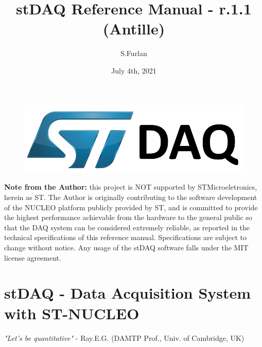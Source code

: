 \documentclass[letterpaper,10pt,english]{hitec}
\title{stDAQ Reference Manual - r.1.1 (Antille)}
\date{July 4th, 2021}
\author{S.Furlan}
\begin{document}
\maketitle

\vspace{1cm}

\begin{figure}[ht]
\includegraphics[scale=0.6]{../img/stDAQ_logo.png}
\label{fig:stDAQ_logo}
\end{figure}

\vspace{6cm}
\hrulefill

\small
\textbf{Note from the Author:} this project is NOT supported by STMicroeletronics, herein as ST.
The Author is originally contributing to the software development of the NUCLEO platform publicly provided by ST, and is committed to provide the highest performance achievable from the hardware to the general public so that the DAQ system can be considered extremely reliable, as reported in the technical specifications of this reference manual. Specifications are subject to change without notice.
Any usage of the stDAQ software falls under the MIT license agreement.
\normalsize

\blinddocument
\newpage

\tableofcontents

\newpage

\section{stDAQ - Data Acquisition System with ST-NUCLEO}

\begin{flushright}
\textit{"Let's be quantitative"} - Ray.E.G. (DAMTP Prof., Univ. of Cambridge, UK)
\end{flushright}

\vskip 0.5cm
\end{document}
